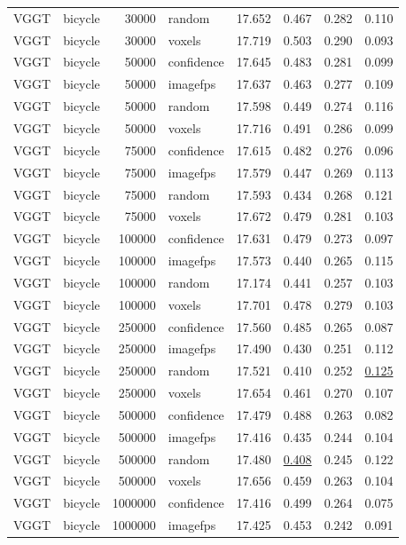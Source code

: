 \begin{table}[H]
\begin{tabular}{llrlrrrr}
VGGT & bicycle & 30000 & random & 17.652 & 0.467 & 0.282 & 0.110 \\
VGGT & bicycle & 30000 & voxels & 17.719 & 0.503 & 0.290 & 0.093 \\
VGGT & bicycle & 50000 & confidence & 17.645 & 0.483 & 0.281 & 0.099 \\
VGGT & bicycle & 50000 & imagefps & 17.637 & 0.463 & 0.277 & 0.109 \\
VGGT & bicycle & 50000 & random & 17.598 & 0.449 & 0.274 & 0.116 \\
VGGT & bicycle & 50000 & voxels & 17.716 & 0.491 & 0.286 & 0.099 \\
VGGT & bicycle & 75000 & confidence & 17.615 & 0.482 & 0.276 & 0.096 \\
VGGT & bicycle & 75000 & imagefps & 17.579 & 0.447 & 0.269 & 0.113 \\
VGGT & bicycle & 75000 & random & 17.593 & 0.434 & 0.268 & 0.121 \\
VGGT & bicycle & 75000 & voxels & 17.672 & 0.479 & 0.281 & 0.103 \\
VGGT & bicycle & 100000 & confidence & 17.631 & 0.479 & 0.273 & 0.097 \\
VGGT & bicycle & 100000 & imagefps & 17.573 & 0.440 & 0.265 & 0.115 \\
VGGT & bicycle & 100000 & random & 17.174 & 0.441 & 0.257 & 0.103 \\
VGGT & bicycle & 100000 & voxels & 17.701 & 0.478 & 0.279 & 0.103 \\
VGGT & bicycle & 250000 & confidence & 17.560 & 0.485 & 0.265 & 0.087 \\
VGGT & bicycle & 250000 & imagefps & 17.490 & 0.430 & 0.251 & 0.112 \\
VGGT & bicycle & 250000 & random & 17.521 & 0.410 & 0.252 & \underline{0.125} \\
VGGT & bicycle & 250000 & voxels & 17.654 & 0.461 & 0.270 & 0.107 \\
VGGT & bicycle & 500000 & confidence & 17.479 & 0.488 & 0.263 & 0.082 \\
VGGT & bicycle & 500000 & imagefps & 17.416 & 0.435 & 0.244 & 0.104 \\
VGGT & bicycle & 500000 & random & 17.480 & \underline{0.408} & 0.245 & 0.122 \\
VGGT & bicycle & 500000 & voxels & 17.656 & 0.459 & 0.263 & 0.104 \\
VGGT & bicycle & 1000000 & confidence & 17.416 & 0.499 & 0.264 & 0.075 \\
VGGT & bicycle & 1000000 & imagefps & 17.425 & 0.453 & 0.242 & 0.091 \\

\end{tabular}
\end{table}
